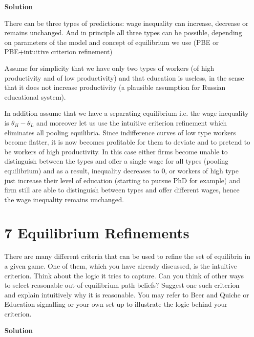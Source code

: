 \documentclass[a4paper]{article}
\begin{document}
\textbf{Solution}

There can be three types of predictions: wage inequality can increase, decrease or remains unchanged. And in principle all three types can be possible, depending on parameters of the model and concept of equilibrium we use (PBE or PBE+intuitive criterion refinement)


Assume for simplicity that we have only two types of workers (of high productivity and of low productivity) and that education is useless, in the sense that it does not increase productivity (a plausible assumption for Russian educational system).

In addition assume that we have a separating equilibrium i.e. the wage inequality is $\theta_H - \theta_L$ and moreover let us use the intuitive criterion refinement which eliminates all pooling equilibria. Since indifference curves of low type workers become flatter, it is now becomes profitable for them to deviate and to pretend to be workers of high productivity. In this case either firms become unable to distinguish between the types and offer a single wage for all types (pooling equilibrium) and as a result, inequality decreases to 0, or workers of high type just increase their level of education (starting to pursue PhD for example) and firm still are able to distinguish between types and offer different wages, hence the wage inequality remains unchanged.
\section*{7 Equilibrium Refinements}
	There are many different criteria that can be used to refine the set of equilibria in a given
	game. One of them, which you have already discussed, is the intuitive criterion. Think about
	the logic it tries to capture. Can you think of other ways to select reasonable out-of-equilibrium path beliefs? Suggest one such criterion and explain intuitively why it is reasonable. You may
	refer to Beer and Quiche or Education signalling or your own set up to illustrate the logic behind
	your criterion.
	
	
	\textbf{Solution}
	
\end{document}
